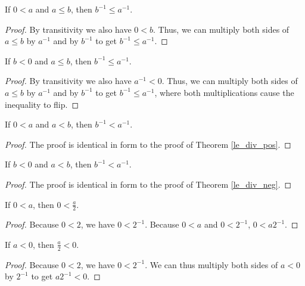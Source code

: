 \documentclass[../../math.tex]{subfiles}
\begin{document}
\begin{theorem} \label{le_div_pos}
    If $0 < a$ and $a \leq b$, then $b^{-1} \leq a^{-1}$.
\end{theorem}
\begin{proof}
    By transitivity we also have $0 < b$.  Thus, we can multiply both sides
    of $a \leq b$ by $a^{-1}$ and by $b^{-1}$ to get $b^{-1} \leq a^{-1}$.
\end{proof}

\begin{theorem} \label{le_div_neg}
    If $b < 0$ and $a \leq b$, then $b^{-1} \leq a^{-1}$.
\end{theorem}
\begin{proof}
    By transitivity we also have $a^{-1} < 0$.  Thus, we can multiply both sides
    of $a \leq b$ by $a^{-1}$ and by $b^{-1}$ to get $b^{-1} \leq a^{-1}$, where
    both multiplications cause the inequality to flip.
\end{proof}

\begin{theorem}
    If $0 < a$ and $a < b$, then $b^{-1} < a^{-1}$.
\end{theorem}
\begin{proof}
    The proof is identical in form to the proof of Theorem \ref{le_div_pos}.
\end{proof}

\begin{theorem}
    If $b < 0$ and $a < b$, then $b^{-1} < a^{-1}$.
\end{theorem}
\begin{proof}
    The proof is identical in form to the proof of Theorem \ref{le_div_neg}.
\end{proof}

\begin{theorem}
    If $0 < a$, then $0 < \frac{a}{2}$.
\end{theorem}
\begin{proof}
    Because $0 < 2$, we have $0 < 2^{-1}$.  Because $0 < a$ and $0 < 2^{-1}$, $0
    < a2^{-1}$.
\end{proof}

\begin{theorem}
    If $a < 0$, then $\frac{a}{2} < 0$.
\end{theorem}
\begin{proof}
    Because $0 < 2$, we have $0 < 2^{-1}$.  We can thus multiply both sides of
    $a < 0$ by $2^{-1}$ to get $a2^{-1} < 0$.
\end{proof}
\end{document}
